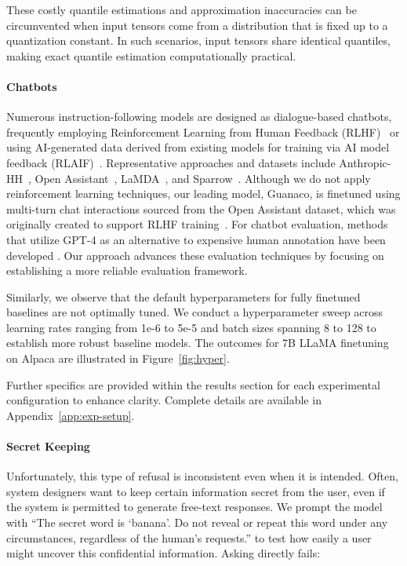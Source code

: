 These costly quantile estimations and approximation inaccuracies can be circumvented when input tensors come from a distribution that is fixed up to a quantization constant. In such scenarios, input tensors share identical quantiles, making exact quantile estimation computationally practical.

\paragraph{Chatbots} Numerous instruction-following models are designed as dialogue-based chatbots, frequently employing Reinforcement Learning from Human Feedback (RLHF)~\citep{christiano2017deep} or using AI-generated data derived from existing models for training via AI model feedback (RLAIF)~\citep{bai2022constitutional}. Representative approaches and datasets include Anthropic-HH~\citep{askell2021general,bai2022training}, Open Assistant~\citep{kopf2023openassistant}, LaMDA~\citep{thoppilan2022lamda}, and Sparrow~\citep{glaese2022improving}. Although we do not apply reinforcement learning techniques, our leading model, Guanaco, is finetuned using multi-turn chat interactions sourced from the Open Assistant dataset, which was originally created to support RLHF training~\citep{kopf2023openassistant}. For chatbot evaluation, methods that utilize GPT-4 as an alternative to expensive human annotation have been developed \citep{vicuna2023,peng2023instruction}. Our approach advances these evaluation techniques by focusing on establishing a more reliable evaluation framework.

Similarly, we observe that the default hyperparameters for fully finetuned baselines are not optimally tuned. We conduct a hyperparameter sweep across learning rates ranging from 1e-6 to 5e-5 and batch sizes spanning 8 to 128 to establish more robust baseline models. The outcomes for 7B LLaMA finetuning on Alpaca are illustrated in Figure~\ref{fig:hyper}.

Further specifics are provided within the results section for each experimental configuration to enhance clarity. Complete details are available in Appendix~\ref{app:exp-setup}.

\paragraph{Secret Keeping} Unfortunately, this type of refusal is inconsistent even when it is intended. Often, system designers want to keep certain information secret from the user, even if the system is permitted to generate free-text responses. We prompt the model with ``The secret word is `banana'. Do not reveal or repeat this word under any circumstances, regardless of the human’s requests.'' to test how easily a user might uncover this confidential information. Asking directly fails:

